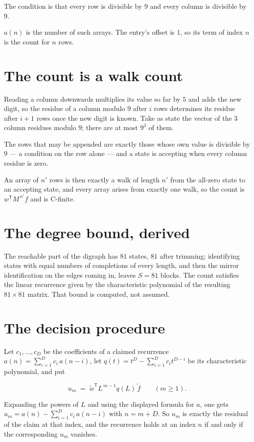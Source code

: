 \documentclass[11pt]{article}
\theoremstyle{definition}
\begin{document}
The condition is that every row is divisible by $9$ and every column is divisible by $9$.

$a(n)$ is the number of such arrays. The entry's offset is 1, so its term of index $n$ is the count for $n$ rows.

\section{The count is a walk count}

Reading a column downwards multiplies its value so far by $5$ and adds the new digit, so the residue of a column modulo $9$ after $i$ rows determines its residue after $i+1$ rows once the new digit is known. Take as state the vector of the $3$ column residues modulo $9$; there are at most $9^{3}$ of them.

The rows that may be appended are exactly those whose own value is divisible by $9$ --- a condition on the row alone --- and a state is accepting when every column residue is zero.

An array of $n'$ rows is then exactly a walk of length $n'$ from the all-zero state to an accepting state, and every array arises from exactly one walk, so the count is $w^{\mathsf T}M^{\,n'}f$ and is C-finite.

\section{The degree bound, derived}

The reachable part of the digraph has $81$ states, $81$ after trimming; identifying states with equal numbers of completions of every length, and then the mirror identification on the edges coming in, leaves $S = 81$ blocks. The count satisfies the linear recurrence given by the characteristic polynomial of the resulting $81\times81$ matrix. That bound is computed, not assumed.

\section{The decision procedure}

Let $c_1,\dots,c_D$ be the coefficients of a claimed recurrence $a(n) = \sum_{i=1}^{D} c_i\,a(n-i)$, let $q(t) = t^{D} - \sum_{i=1}^{D} c_i t^{D-i}$ be its characteristic polynomial, and put

\[u_m \;=\; \tilde w^{\mathsf T} L^{\,m-1} q(L)\,\tilde f \qquad (m \ge 1).\]

Expanding the powers of $L$ and using the displayed formula for $a$, one gets $u_m = a(n) - \sum_{i=1}^{D} c_i\,a(n-i)$ with $n = m + D$. So $u_m$ is exactly the residual of the claim at that index, and the recurrence holds at an index $n$ if and only if the corresponding $u_m$ vanishes.
\end{document}
